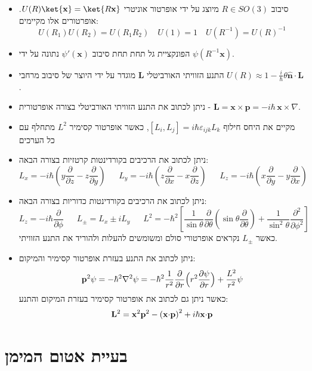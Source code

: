 \documentclass{tstextbook}
\begin{document}
\begin{summary}
  \begin{itemize}
    \item סיבוב \(R \in SO(3)\) מיוצג על ידי אופרטור אוניטרי \(U(R)\ket{\mathbf{x}}=\ket{R\mathbf{x}}\). אופרטורים אלו מקיימים:
$$U(R_{1})U(R_{2})=U(R_{1}R_{2})\quad U(1)=1\quad U(R^{-1})=U(R)^{-1}$$
    \item הפונקציית גל תחת תחת סיבוב \(\psi'\left( \mathbf{x} \right)\) נתונה על ידי \(\psi\left( R^{-1}\mathbf{x} \right)\).
    \item התנע הזוויתי האורביטלי \(\mathbf{L}\) מוגדר על ידי היוצר של סיבוב מרחבי \(U(R)\approx1-{\frac{i}{\hbar}}\theta\mathbf{\hat{n}}\cdot\mathbf{L}\).
    \item ניתן לכתוב את התנע הזוויתי האורביטלי בצורה אופרטורית - \(\mathbf{L}=\mathbf{x}\times\mathbf{p}=-i\hbar\,\mathbf{x}\times\nabla\).
    \item מקיים את היחס חילוף \([L_{i},L_{j}]=i\hbar\varepsilon_{i j k}L_{k}\), כאשר אופרטור קסימיר \(L^{2}\) מתחלף עם כל הערכים
    \item ניתן לכתוב את הרכיבים בקורדינטות קרטזיות בצורה הבאה:
$${{L_{x}=-i\hbar\left(y\frac{\partial}{\partial z}-z\frac{\partial}{\partial y}\right)}}\quad \;\; {{L_{y}=-i\hbar\left(z\frac{\partial}{\partial x}-x\frac{\partial}{\partial z}\right)}}\;\;\quad  {{L_{z}=-i\hbar\left(x\frac{\partial}{\partial y}-y\frac{\partial}{\partial x}\right)}}$$
    \item ניתן לכתוב את הרכיבים בקורדינטות כדוריות בצורה הבאה:
$$L_{z}=-i\hbar\frac{\partial}{\partial\phi}\;\;\quad L_{\pm}=L_{x}\pm i L_{y}\;\;\quad L^{2}=-\hbar^{2}\left[\frac{1}{\sin\theta}\frac{\partial}{\partial\theta}\left(\sin\theta\frac{\partial}{\partial\theta}\right)+\frac{1}{\sin^{2}\theta}\frac{\partial^{2}}{\partial\phi^{2}}\right]$$
כאשר \(L_{\pm}\) נקראים אופרטורי סולם ומשומשים להעלות ולהוריד את התנע הזוויתי.
    \item ניתן לכתוב את התנע בעזרת אופרטור קסימיר והמיקום:
$${\bf p}^{2}\psi=-\hbar^{2}\nabla^{2}\psi=-\hbar^{2}\frac{1}{r^{2}}\frac{\partial}{\partial r}\Big(r^{2}\frac{\partial\psi}{\partial r}\Big)+\frac{L^{2}}{r^{2}}\psi$$
כאשר ניתן גם לכתוב את אופרטור קסימיר בעזרת המיקום והתנע:
$${\bf L}^{2}={\bf x}^{2}{\bf p}^{2}-\left({\bf x}{\cdot}{\bf p}\right)^{2}+i\hbar{\bf x}{\cdot}{\bf p}$$
  \end{itemize}
\end{summary}
\section{בעיית אטום המימן}
\end{document}
